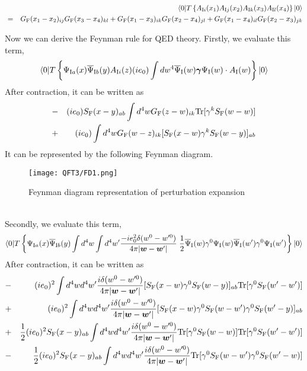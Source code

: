 \begin{example}
\begin{eqnarray}
&& \langle 0 | T \left\{ A_{{\rm I}i}(x_1) A_{{\rm I}j}(x_2) A_{{\rm I}k}(x_3) A_{{\rm I}l}(x_4)\right\}| 0 \rangle \nonumber \\
&=&  G_{\rm F}(x_1-x_2)_{ij} G_{\rm F}(x_3-x_4)_{kl} + G_{\rm F}(x_1-x_3)_{ik}G_{\rm F}(x_2-x_4)_{jl} +  G_{\rm F}(x_1-x_4)_{il}G_{\rm F}(x_2-x_3)_{jk} \nonumber
\end{eqnarray}
\end{example}
\noindent
Now we can derive the Feynman rule for QED theory.
Firstly, we evaluate this term,
\[\langle 0 | T \left\{ \Psi_{{\rm I}a}(x) \overline{\Psi}_{{\rm I}b}(y) A_{{\rm I}i}(z) (i e_0) \int dw^4 \overline{\Psi}_{\rm I}(w) \bm{\gamma} \Psi_{\rm I}(w) \cdot A_{\rm I}(w) \right\} | 0 \rangle\]
After contraction, it can be written as
\begin{eqnarray}
&-&  (ie_0) S_{\rm F}(x-y)_{ab} \int d^4 w G_{\rm F}(z-w)_{ik} \mathrm{Tr}[\gamma^k S_{\rm F}(w-w)] \nonumber \\
&+&  (ie_0) \int d^4 w G_{\rm F}(w-z)_{ik}  [S_{\rm F}(x-w) \gamma^k S_{\rm F}(w-y)]_{ab}  \nonumber
\end{eqnarray}
It can be represented by the following Feynman diagram.
\begin{figure}[!h]
\centering
\texttt{[image: QFT3/FD1.png]}
\caption{Feynman diagram representation of perturbation expansion}
\end{figure}\\
Secondly, we evaluate this term,
\[\langle 0 | T \left\{ \Psi_{{\rm I}a}(x) \overline{\Psi}_{{\rm I}b}(y) \int d^4w \int d^4w' \frac{-ie_0^2\delta(w^0-w'^0)}{4\pi|\bm{w}-\bm{w}'|}\; \frac{1}{2} \overline{\Psi}_{\rm I}(w)\gamma^0 \Psi_{\rm I}(w) \overline{\Psi}_{\rm I}(w')\gamma^0 \Psi_{\rm I}(w') \right\} | 0 \rangle\]
After contraction, it can be written as
\begin{eqnarray}
&-&  (ie_0)^2 \int d^4w d^4w' \frac{i\delta(w^0-w'^0)}{4\pi|\bm{w}-\bm{w}'|} [S_{\rm F}(x-w)\gamma^0 S_{\rm F}(w-y)]_{ab} \mathrm{Tr}[\gamma^0 S_{\rm F}(w'-w')] \nonumber \\
&+&  (ie_0)^2 \int d^4w d^4w' \frac{i\delta(w^0-w'^0)}{4\pi|\bm{w}-\bm{w}'|} [S_{\rm F}(x-w)\gamma^0 S_{\rm F}(w-w') \gamma^0 S_{\rm F}(w'-y)]_{ab} \nonumber \\
&+& \frac{1}{2} (ie_0)^2 S_{\rm F}(x-y)_{ab} \int d^4w d^4w' \frac{i\delta(w^0-w'^0)}{4\pi|\bm{w}-\bm{w}'|} \mathrm{Tr}[\gamma^0 S_{\rm F}(w-w)] \mathrm{Tr}[\gamma^0 S_{\rm F}(w'-w')] \nonumber \\
&-& \frac{1}{2} (ie_0)^2 S_{\rm F}(x-y)_{ab} \int d^4w d^4w' \frac{i\delta(w^0-w'^0)}{4\pi|\bm{w}-\bm{w}'|} \mathrm{Tr}[\gamma^0 S_{\rm F}(w-w')\gamma^0 S_{\rm F}(w'-w)] \nonumber
\end{eqnarray}
